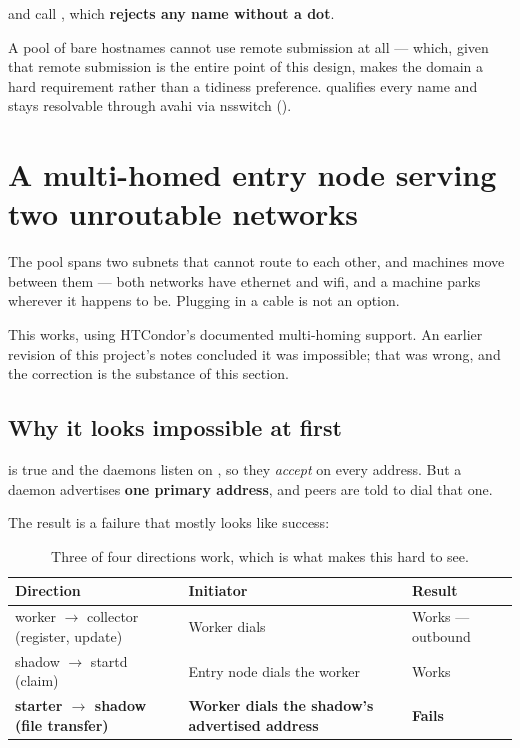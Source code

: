  and  call
, which \textbf{rejects any name without a dot}.

A pool of bare hostnames cannot use remote submission at all --- which, given
that remote submission is the entire point of this design, makes the domain a
hard requirement rather than a tidiness preference.
 qualifies every name and stays resolvable
through avahi via nsswitch ().

\section{A multi-homed entry node serving two unroutable networks}

The pool spans two subnets that cannot route to each other, and machines move
between them --- both networks have ethernet and wifi, and a machine parks
wherever it happens to be. Plugging in a cable is not an option.

This works, using HTCondor's documented multi-homing support. An earlier revision
of this project's notes concluded it was impossible; that was wrong, and the
correction is the substance of this section.

\subsection{Why it looks impossible at first}

 is true and the daemons listen on ,
so they \emph{accept} on every address. But a daemon advertises \textbf{one
primary address}, and peers are told to dial that one.

The result is a failure that mostly looks like success:

\begin{table}[H]
\centering
\begin{tabularx}{\textwidth}{L{0.30\textwidth} L{0.28\textwidth} Y}
\toprule
\textbf{Direction} & \textbf{Initiator} & \textbf{Result} \\
\midrule
worker $\rightarrow$ collector (register, update) & Worker dials  & Works --- outbound \\
shadow $\rightarrow$ startd (claim) & Entry node dials the worker & Works \\
\textbf{starter $\rightarrow$ shadow (file transfer)} & \textbf{Worker dials the shadow's advertised address} & \textbf{Fails} \\
\bottomrule
\end{tabularx}
\caption{Three of four directions work, which is what makes this hard to see.}
\end{table}

